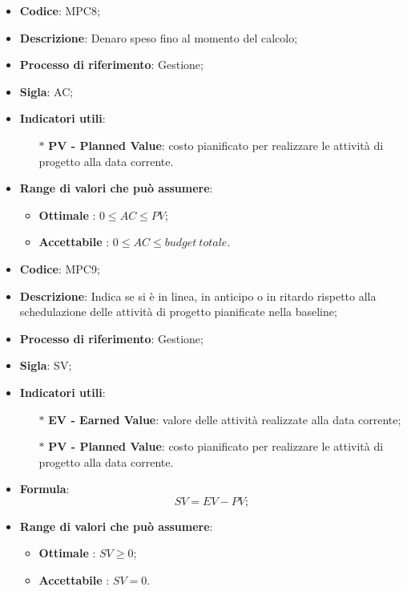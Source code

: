 \vspace{-1cm}
\begin{itemize}
	\item \textbf{Codice}: MPC8;
	\item \textbf{Descrizione}: Denaro speso fino al momento del calcolo;
	\item \textbf{Processo di riferimento}: Gestione;
	\item \textbf{Sigla}: AC;
	\item \textbf{Indicatori utili}: 
		\begin{itemize}
			\item[$\ast$] \textbf{PV - Planned Value}: costo pianificato per realizzare le attività di progetto alla data corrente.
		\end{itemize}
	\item \textbf{Range di valori che può assumere}: 
		\begin{itemize}
			\item \textbf{Ottimale} : $0 \leq AC \leq PV $;
			\item \textbf{Accettabile} : $0 \leq AC \leq budget \ totale $.
		\end{itemize}
\end{itemize}
\vspace{-1cm}
\begin{itemize}
	\item \textbf{Codice}: MPC9;
	\item \textbf{Descrizione}: Indica se si è in linea, in anticipo o in ritardo rispetto alla schedulazione delle attività di progetto pianificate nella baseline;
	\item \textbf{Processo di riferimento}: Gestione;
	\item \textbf{Sigla}: SV;
	\item \textbf{Indicatori utili}: 
		\begin{itemize}
		\item[$\ast$] \textbf{EV - Earned Value}: valore delle attività realizzate alla data corrente;
		\item[$\ast$] \textbf{PV - Planned Value}: costo pianificato per realizzare le attività di progetto alla data corrente.
		\end{itemize}
	\item \textbf{Formula}: \[ SV = EV - PV; \]
	\item \textbf{Range di valori che può assumere}: 
		\begin{itemize}
			\item \textbf{Ottimale} : $SV \geq 0$;
			\item \textbf{Accettabile} : $SV = 0$.
		\end{itemize}
\end{itemize}
